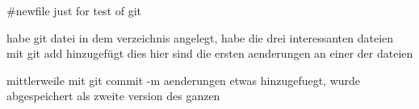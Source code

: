 #newfile just for test of git

habe git datei in dem verzeichnis angelegt,
habe die drei interessanten dateien mit git add hinzugefügt
dies hier sind die ersten aenderungen an einer der dateien

mittlerweile mit git commit -m aenderungen etwas hinzugefuegt, 
wurde abgespeichert als zweite version des ganzen
